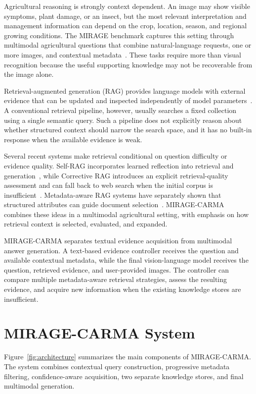 \documentclass[runningheads]{llncs}
\begin{document}
Agricultural reasoning is strongly context dependent. An image may show visible symptoms, plant damage, or an insect, but the most relevant interpretation and management information can depend on the crop, location, season, and regional growing conditions. The MIRAGE benchmark captures this setting through multimodal agricultural questions that combine natural-language requests, one or more images, and contextual metadata~\cite{dongre2025mirage}. These tasks require more than visual recognition because the useful supporting knowledge may not be recoverable from the image alone.

Retrieval-augmented generation (RAG) provides language models with external evidence that can be updated and inspected independently of model parameters~\cite{lewis2020rag}. A conventional retrieval pipeline, however, usually searches a fixed collection using a single semantic query. Such a pipeline does not explicitly reason about whether structured context should narrow the search space, and it has no built-in response when the available evidence is weak.

Several recent systems make retrieval conditional on question difficulty or evidence quality. Self-RAG incorporates learned reflection into retrieval and generation~\cite{asai2024selfrag}, while Corrective RAG introduces an explicit retrieval-quality assessment and can fall back to web search when the initial corpus is insufficient~\cite{yan2024crag}. Metadata-aware RAG systems have separately shown that structured attributes can guide document selection~\cite{poliakov2025multimetarag}. MIRAGE-CARMA combines these ideas in a multimodal agricultural setting, with emphasis on how retrieval context is selected, evaluated, and expanded.

MIRAGE-CARMA separates textual evidence acquisition from multimodal answer generation. A text-based evidence controller receives the question and available contextual metadata, while the final vision-language model receives the question, retrieved evidence, and user-provided images. The controller can compare multiple metadata-aware retrieval strategies, assess the resulting evidence, and acquire new information when the existing knowledge stores are insufficient.

\section{MIRAGE-CARMA System}

Figure~\ref{fig:architecture} summarizes the main components of MIRAGE-CARMA. The system combines contextual query construction, progressive metadata filtering, confidence-aware acquisition, two separate knowledge stores, and final multimodal generation.
\end{document}
